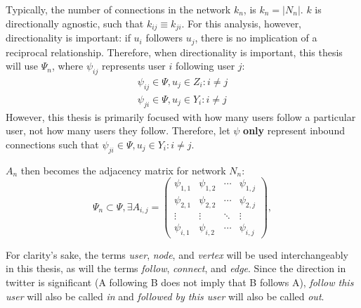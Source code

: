 \documentclass[preprint,review,12pt]{elsarticle}
\begin{document}
Typically, the number of connections in the network $k_n$, is $k_n = |N_n|$. $k$ is directionally agnostic, such that $k_{ij} \equiv k_{ji}$. For this analysis, however, directionality is important: if $u_i$ followers $u_j$, there is no implication of a reciprocal relationship. Therefore, when directionality is important, this thesis will use $\Psi_n$, where $\psi_{ij}$ represents user $i$ following user $j$:
    \begin{equation}
    \begin{split}
    \label{Psi Equation}
        \psi_{ij} \in \Psi, u_j \in Z_i: i \neq j \\
        \psi_{ji} \in \Psi, u_j \in Y_i: i \neq j 
    \end{split}
    \end{equation}
However, this thesis is primarily focused with how many users follow a particular user, not how many users they follow. Therefore, let $\psi$ \textbf{only} represent inbound connections such that $\psi_{ji} \in \Psi, u_j \in Y_i: i \neq j$.

$A_n$ then becomes the adjacency matrix for network $N_n$:
    \begin{equation*}
    \label{adjacencey matrix}
\Psi_n \subset \Psi, \exists A_{i,j} = 
\begin{pmatrix}
\psi_{1,1} & \psi_{1,2} & \cdots & \psi_{1,j} \\
\psi_{2,1} & \psi_{2,2} & \cdots & \psi_{2,j} \\
\vdots  & \vdots  & \ddots & \vdots  \\
\psi_{i,1} & \psi_{i,2} & \cdots & \psi_{i,j} 
\end{pmatrix}, 
\end{equation*}
    

For clarity's sake, the terms \textit{user}, \textit{node}, and \textit{vertex} will be used interchangeably in this thesis, as will the terms \textit{follow}, \textit{connect}, and \textit{edge}. Since the direction in twitter is significant (A following B does not imply that B follows A), \textit{follow this user} will also be called \textit{in} and \textit{followed by this user} will also be called \textit{out}.
\end{document}
